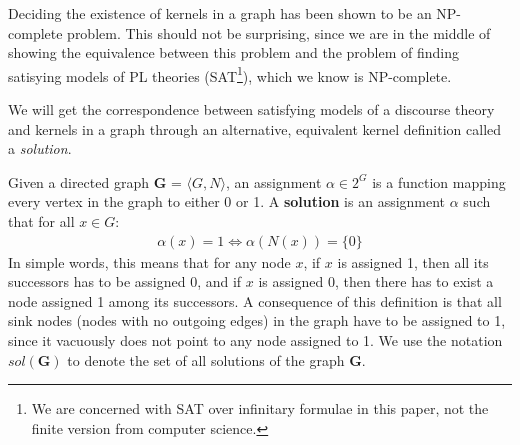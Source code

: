 Deciding the existence of kernels in a graph has been shown to be an NP-complete\cite{chvatal} problem.
This should not be surprising, since we are in the middle of showing the equivalence between this problem and the problem of finding satisying models of PL theories (SAT\footnote{We are concerned with SAT over infinitary formulae in this paper, not the finite version from computer science.}), which we know is NP-complete.

We will get the correspondence between satisfying models of a discourse theory and kernels in a graph through an alternative, equivalent kernel definition called a \textit{solution}.

Given a directed graph \textbf{G} = $\langle G,N \rangle$, an assignment $\alpha \in 2^G$ is a function mapping every vertex in the graph to either 0 or 1.
A \textbf{solution} is an assignment $\alpha$ such that for all $x \in G:$
\begin{align}
  \alpha(x) = 1 \iff \alpha(N(x)) = \{ 0 \}
\end{align}
In simple words, this means that for any node $x$, if $x$ is assigned 1, then all its successors has to be assigned  0, and if $x$ is assigned 0, then there has to exist a node assigned 1 among its successors.
A consequence of this definition is that all sink nodes (nodes with no outgoing edges) in the graph have to be assigned to 1, since it vacuously does not point to any node assigned to 1.
We use the notation $sol(\mathbf{G})$ to denote the set of all solutions of the graph \textbf{G}.
